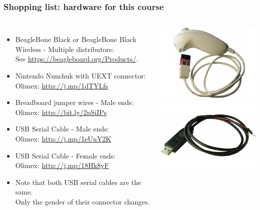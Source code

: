 \begin{frame}
\frametitle{Shopping list: hardware for this course}
  \begin{columns}
    \footnotesize
    \begin{itemize}
      \item BeagleBone Black or BeagleBone Black Wireless - Multiple distributors: \\
	    See \url{https://beagleboard.org/Products/}.
      \item Nintendo Nunchuk with UEXT connector: \\
            Olimex: \url{http://j.mp/1dTYLfs}
      \item Breadboard jumper wires - Male ends: \\
	    Olimex: \url{http://bit.ly/2pSiIPs}
      \item USB Serial Cable - Male ends: \\
	    Olimex: \url{http://j.mp/1eUuY2K}
      \item USB Serial Cable - Female ends: \\
	    Olimex: \url{http://j.mp/18Hk8yF}
      \item Note that both USB serial cables are the same.\\
            Only the gender of their connector changes.
    \end{itemize}
    \includegraphics[height=0.25\textheight]{slides/kernel-shopping-list/nunchuk.jpg} \\
    \includegraphics[height=0.20\textheight]{slides/kernel-shopping-list/usb-serial-cable-male.jpg} \\

\end{columns}
\end{frame}
